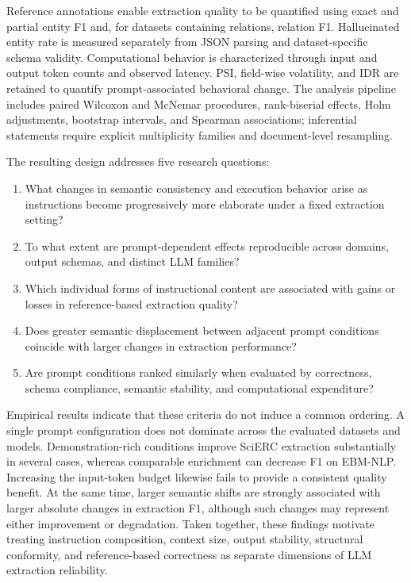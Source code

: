 \documentclass[fleqn,10pt]{wlscirep-authoryear}
\begin{document}
Reference annotations enable extraction quality to be quantified using exact and
partial entity F1 and, for datasets containing relations, relation F1.
Hallucinated entity rate is measured separately from JSON parsing and
dataset-specific schema validity. Computational behavior is characterized through
input and output token counts and observed latency. PSI, field-wise volatility,
and IDR are retained to quantify prompt-associated behavioral change. %
The analysis pipeline includes paired Wilcoxon and McNemar procedures, rank-biserial effects, Holm adjustments, bootstrap intervals, and Spearman associations; inferential statements require explicit multiplicity families and document-level resampling.

The resulting design addresses five research questions:

\begin{enumerate}[label=\textbf{RQ\arabic*:},leftmargin=*]
    \item What changes in semantic consistency and execution behavior arise as
    instructions become progressively more elaborate under a fixed extraction
    setting?

    \item To what extent are prompt-dependent effects reproducible across domains,
    output schemas, and distinct LLM families?

    \item Which individual forms of instructional content are associated with
    gains or losses in reference-based extraction quality?

    \item Does greater semantic displacement between adjacent prompt conditions
    coincide with larger changes in extraction performance?

    \item Are prompt conditions ranked similarly when evaluated by correctness,
    schema compliance, semantic stability, and computational expenditure?
\end{enumerate}

Empirical results indicate that these criteria do not induce a common ordering.
A single prompt configuration does not dominate across the evaluated datasets and
models. Demonstration-rich conditions improve SciERC extraction substantially in
several cases, whereas comparable enrichment can decrease F1 on EBM-NLP.
Increasing the input-token budget likewise fails to provide a consistent quality
benefit. At the same time, larger semantic shifts are strongly associated with
larger absolute changes in extraction F1, although such changes may represent
either improvement or degradation. Taken together, these findings motivate
treating instruction composition, context size, output stability, structural
conformity, and reference-based correctness as separate dimensions of LLM
extraction reliability.
\end{document}
